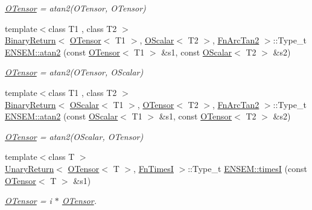 \begin{DoxyCompactItemize}
\begin{DoxyCompactList}\small\item\em \mbox{\hyperlink{classENSEM_1_1OTensor}{O\+Tensor}} = atan2(\+O\+Tensor, O\+Tensor) \end{DoxyCompactList}\item 
{\footnotesize template$<$class T1 , class T2 $>$ }\\\mbox{\hyperlink{structENSEM_1_1BinaryReturn}{Binary\+Return}}$<$ \mbox{\hyperlink{classENSEM_1_1OTensor}{O\+Tensor}}$<$ T1 $>$, \mbox{\hyperlink{classENSEM_1_1OScalar}{O\+Scalar}}$<$ T2 $>$, \mbox{\hyperlink{structENSEM_1_1FnArcTan2}{Fn\+Arc\+Tan2}} $>$\+::Type\+\_\+t \mbox{\hyperlink{group__obstensor_gaba8ed2c3683bbcbda35e8a372d7ee2e6}{E\+N\+S\+E\+M\+::atan2}} (const \mbox{\hyperlink{classENSEM_1_1OTensor}{O\+Tensor}}$<$ T1 $>$ \&s1, const \mbox{\hyperlink{classENSEM_1_1OScalar}{O\+Scalar}}$<$ T2 $>$ \&s2)
\begin{DoxyCompactList}\small\item\em \mbox{\hyperlink{classENSEM_1_1OTensor}{O\+Tensor}} = atan2(\+O\+Tensor, O\+Scalar) \end{DoxyCompactList}\item 
{\footnotesize template$<$class T1 , class T2 $>$ }\\\mbox{\hyperlink{structENSEM_1_1BinaryReturn}{Binary\+Return}}$<$ \mbox{\hyperlink{classENSEM_1_1OScalar}{O\+Scalar}}$<$ T1 $>$, \mbox{\hyperlink{classENSEM_1_1OTensor}{O\+Tensor}}$<$ T2 $>$, \mbox{\hyperlink{structENSEM_1_1FnArcTan2}{Fn\+Arc\+Tan2}} $>$\+::Type\+\_\+t \mbox{\hyperlink{group__obstensor_ga81f7f5b4d6ba20b09ce1c6a2f7284657}{E\+N\+S\+E\+M\+::atan2}} (const \mbox{\hyperlink{classENSEM_1_1OScalar}{O\+Scalar}}$<$ T1 $>$ \&s1, const \mbox{\hyperlink{classENSEM_1_1OTensor}{O\+Tensor}}$<$ T2 $>$ \&s2)
\begin{DoxyCompactList}\small\item\em \mbox{\hyperlink{classENSEM_1_1OTensor}{O\+Tensor}} = atan2(\+O\+Scalar, O\+Tensor) \end{DoxyCompactList}\item 
{\footnotesize template$<$class T $>$ }\\\mbox{\hyperlink{structENSEM_1_1UnaryReturn}{Unary\+Return}}$<$ \mbox{\hyperlink{classENSEM_1_1OTensor}{O\+Tensor}}$<$ T $>$, \mbox{\hyperlink{structENSEM_1_1FnTimesI}{Fn\+TimesI}} $>$\+::Type\+\_\+t \mbox{\hyperlink{group__obstensor_ga014bfcb56266f5301dcc8a1fe479f8b1}{E\+N\+S\+E\+M\+::timesI}} (const \mbox{\hyperlink{classENSEM_1_1OTensor}{O\+Tensor}}$<$ T $>$ \&s1)
\begin{DoxyCompactList}\small\item\em \mbox{\hyperlink{classENSEM_1_1OTensor}{O\+Tensor}} = i $\ast$ \mbox{\hyperlink{classENSEM_1_1OTensor}{O\+Tensor}}. \end{DoxyCompactList}\item 

\end{DoxyCompactItemize}
